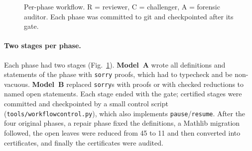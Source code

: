 \documentclass[11pt]{article}
\renewcommand{\_}{\origus\allowbreak}
\newcommand{\code}[1]{\texttt{#1}}
\begin{document}
\begin{figure}[t]
\centering
{}
\caption{Per-phase workflow. R = reviewer, C = challenger, A = forensic auditor. Each phase was
committed to git and checkpointed after its gate.}
\label{fig:workflow}
\end{figure}

\paragraph{Two stages per phase.} Each phase had two stages (Fig.~\ref{fig:workflow}).
\textbf{Model~A} wrote all definitions and statements of the phase with \code{sorry} proofs, which
had to typecheck and be non-vacuous. \textbf{Model~B} replaced \code{sorry}s with proofs or with
checked reductions to named open statements. Each stage ended with the gate; certified stages were
committed and checkpointed by a small control script (\code{tools/workflow\_control.py}), which also
implements \code{pause}/\code{resume}. After the four original phases, a repair phase fixed the
definitions, a Mathlib migration followed, the open leaves were reduced from 45 to 11 and then
converted into certificates, and finally the certificates were audited.
\end{document}
